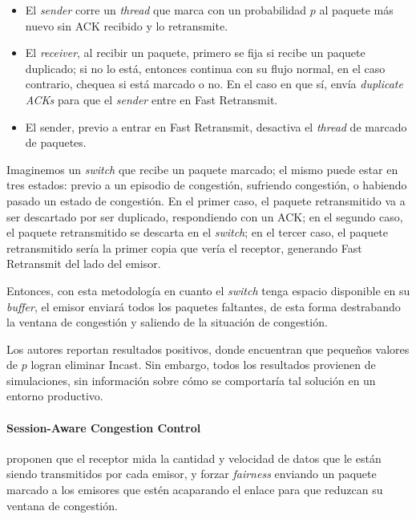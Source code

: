 \documentclass[runningheads,a4paper]{llncs}
\begin{document}
\begin{itemize}
    \item El \textit{sender} corre un \textit{thread} que marca con un probabilidad $p$ al paquete más nuevo sin ACK recibido y lo retransmite.
    
    \item El \textit{receiver}, al recibir un paquete, primero se fija si recibe un paquete duplicado; si no lo está, entonces continua con su flujo normal, en el caso contrario, chequea si está marcado o no. En el caso en que sí, envía \textit{duplicate ACKs} para que el \textit{sender} entre en Fast Retransmit.
    
    \item El sender, previo a entrar en Fast Retransmit, desactiva el \textit{thread} de marcado de paquetes.
\end{itemize}

Imaginemos un \textit{switch} que recibe un paquete marcado; el mismo puede estar en tres estados: previo a un episodio de congestión, sufriendo congestión, o habiendo pasado un estado de congestión. En el primer caso, el paquete retransmitido va a ser descartado por ser duplicado, respondiendo con un ACK; en el segundo caso, el paquete retransmitido se descarta en el \textit{switch}; en el tercer caso, el paquete retransmitido sería la primer copia que vería el receptor, generando Fast Retransmit del lado del emisor.

Entonces, con esta metodología en cuanto el \textit{switch} tenga espacio disponible en su \textit{buffer}, el emisor enviará todos los paquetes faltantes, de esta forma destrabando la ventana de congestión y saliendo de la situación de congestión.

Los autores reportan resultados positivos, donde encuentran que pequeños valores de $p$ logran eliminar Incast. Sin embargo, todos los resultados provienen de simulaciones, sin información sobre cómo se comportaría tal solución en un entorno productivo.

\paragraph{Session-Aware Congestion Control}

\citet{Li_SACC_2016} proponen que el receptor mida la cantidad y velocidad de datos que le están siendo transmitidos por cada emisor, y forzar \textit{fairness} enviando un paquete marcado a los emisores que estén acaparando el enlace para que reduzcan su ventana de congestión.
\end{document}
